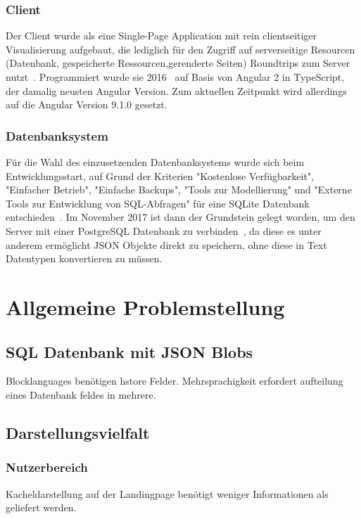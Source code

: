 \subsection{Client}

Der Client wurde als eine Single-Page Application mit rein clientseitiger Visualisierung aufgebaut, 
die lediglich für den Zugriff auf serverseitige Resourcen  (Datenbank, gespeicherte Ressourcen,gerenderte Seiten) Roundtrips zum Server nutzt~\cite[94-95]{riemer2016}. 
Programmiert wurde sie 2016~\cite[1]{riemer2016} auf Basis von Angular 2 in TypeScript, der damalig neusten Angular Version. 
Zum aktuellen Zeitpunkt wird allerdings auf die Angular Version 9.1.0 gesetzt.

\subsection{Datenbanksystem} 

Für die Wahl des einzusetzenden Datenbanksystems wurde sich beim Entwicklungsstart, auf Grund der Kriterien "Kostenlose Verfügbarkeit", 
"Einfacher Betrieb", "Einfache Backups", "Tools zur Modellierung" und "Externe Tools zur Entwicklung von SQL-Abfragen"
 für eine SQLite Datenbank entschieden~\cite[99-100]{riemer2016}. Im November 2017 ist dann der Grundstein gelegt worden, 
 um den Server mit einer PostgreSQL Datenbank zu verbinden~\cite{riemerPostgresCommit}, da diese es unter anderem ermöglicht JSON Objekte direkt zu speichern,
 ohne diese in Text Datentypen konvertieren zu müssen.


\chapter{Allgemeine Problemstellung}

\section{SQL Datenbank mit JSON Blobs}
Blocklanguages benötigen hstore Felder. Mehrsprachigkeit erfordert aufteilung eines Datenbank feldes in mehrere.

\section{Darstellungsvielfalt}
\subsection{Nutzerbereich}
Kacheldarstellung auf der Landingpage benötigt weniger Informationen als geliefert werden.
